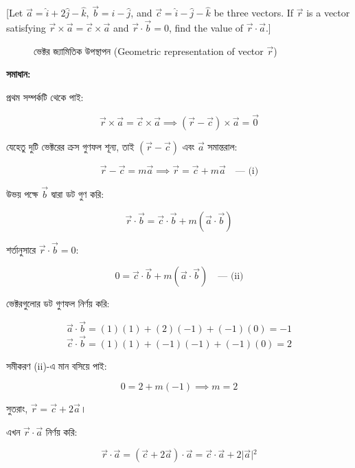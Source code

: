 \documentclass{article}
\begin{document}
[Let $\vec{a} = \hat{i} + 2\hat{j} - \hat{k}$, $\vec{b} = \hat{i} - \hat{j}$, and $\vec{c} = \hat{i} - \hat{j} - \hat{k}$ be three vectors. If $\vec{r}$ is a vector satisfying $\vec{r} \times \vec{a} = \vec{c} \times \vec{a}$ and $\vec{r} \cdot \vec{b} = 0$, find the value of $\vec{r} \cdot \vec{a}$.]

\begin{figure}[h!]
\centering
{}
\caption{ভেক্টর জ্যামিতিক উপস্থাপন (Geometric representation of vector $\vec{r}$)}
\end{figure}

\textbf{সমাধান:}

প্রথম সম্পর্কটি থেকে পাই:

$$\vec{r} \times \vec{a} = \vec{c} \times \vec{a} \implies (\vec{r} - \vec{c}) \times \vec{a} = \vec{0}$$

যেহেতু দুটি ভেক্টরের ক্রস গুণফল শূন্য, তাই $(\vec{r} - \vec{c})$ এবং $\vec{a}$ সমান্তরাল:

$$\vec{r} - \vec{c} = m\vec{a} \implies \vec{r} = \vec{c} + m\vec{a} \quad \text{--- (i)}$$

উভয় পক্ষে $\vec{b}$ দ্বারা ডট গুণ করি:

$$\vec{r} \cdot \vec{b} = \vec{c} \cdot \vec{b} + m(\vec{a} \cdot \vec{b})$$

শর্তানুসারে $\vec{r} \cdot \vec{b} = 0$:

$$0 = \vec{c} \cdot \vec{b} + m(\vec{a} \cdot \vec{b}) \quad \text{--- (ii)}$$

ভেক্টরগুলোর ডট গুণফল নির্ণয় করি:

$$\vec{a} \cdot \vec{b} = (1)(1) + (2)(-1) + (-1)(0) = -1$$
$$\vec{c} \cdot \vec{b} = (1)(1) + (-1)(-1) + (-1)(0) = 2$$

সমীকরণ (ii)-এ মান বসিয়ে পাই:

$$0 = 2 + m(-1) \implies m = 2$$

সুতরাং, $\vec{r} = \vec{c} + 2\vec{a}$।

এখন $\vec{r} \cdot \vec{a}$ নির্ণয় করি:

$$\vec{r} \cdot \vec{a} = (\vec{c} + 2\vec{a}) \cdot \vec{a} = \vec{c} \cdot \vec{a} + 2\vert{}\vec{a}\vert{}^2$$
\end{document}
